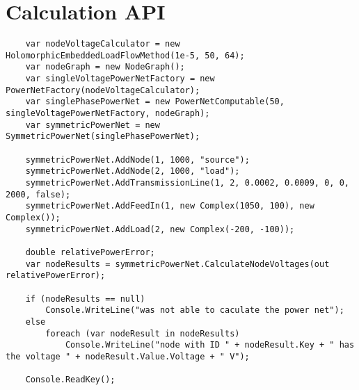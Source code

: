 \chapter{Calculation API}
\label{chap:calculation_api}

\begin{lstlisting}
	var nodeVoltageCalculator = new HolomorphicEmbeddedLoadFlowMethod(1e-5, 50, 64);
	var nodeGraph = new NodeGraph();
	var singleVoltagePowerNetFactory = new PowerNetFactory(nodeVoltageCalculator);
	var singlePhasePowerNet = new PowerNetComputable(50, singleVoltagePowerNetFactory, nodeGraph);
	var symmetricPowerNet = new SymmetricPowerNet(singlePhasePowerNet);

	symmetricPowerNet.AddNode(1, 1000, "source");
	symmetricPowerNet.AddNode(2, 1000, "load");
	symmetricPowerNet.AddTransmissionLine(1, 2, 0.0002, 0.0009, 0, 0, 2000, false);
	symmetricPowerNet.AddFeedIn(1, new Complex(1050, 100), new Complex());
	symmetricPowerNet.AddLoad(2, new Complex(-200, -100));

	double relativePowerError;
	var nodeResults = symmetricPowerNet.CalculateNodeVoltages(out relativePowerError);

	if (nodeResults == null)
		Console.WriteLine("was not able to caculate the power net");
	else
		foreach (var nodeResult in nodeResults)
			Console.WriteLine("node with ID " + nodeResult.Key + " has the voltage " + nodeResult.Value.Voltage + " V");

	Console.ReadKey();
\end{lstlisting}